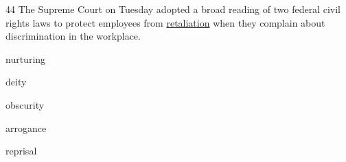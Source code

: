 \begin{question}{44}
The Supreme Court on Tuesday adopted a broad reading of two federal civil rights laws to protect employees from \uline{retaliation} when they complain about discrimination in the workplace.
\begin{choices}
  \item nurturing
  \item deity
  \item obscurity
  \item arrogance
  \item reprisal
\end{choices}
\end{question}
